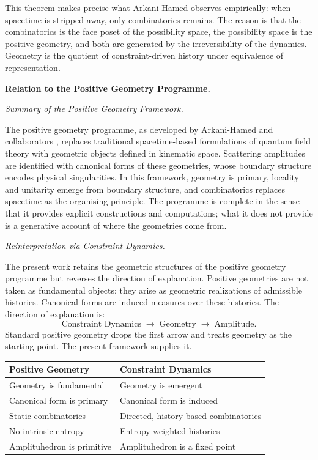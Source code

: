 \documentclass[11pt]{article}
\theoremstyle{plain}
\theoremstyle{definition}
\theoremstyle{remark}
\begin{document}
This theorem makes precise what Arkani-Hamed observes empirically: when spacetime is stripped away, only combinatorics remains. The reason is that the combinatorics is the face poset of the possibility space, the possibility space is the positive geometry, and both are generated by the irreversibility of the dynamics. Geometry is the quotient of constraint-driven history under equivalence of representation.

\bigskip\noindent\textbf{Relation to the Positive Geometry Programme.}
\label{sec:relation}

\medskip\noindent\textit{Summary of the Positive Geometry Framework.}

The positive geometry programme, as developed by Arkani-Hamed and collaborators \cite{ArkaniHamed2017, ArkaniHamed2014, ArkaniHamed2012}, replaces traditional spacetime-based formulations of quantum field theory with geometric objects defined in kinematic space. Scattering amplitudes are identified with canonical forms of these geometries, whose boundary structure encodes physical singularities. In this framework, geometry is primary, locality and unitarity emerge from boundary structure, and combinatorics replaces spacetime as the organising principle. The programme is complete in the sense that it provides explicit constructions and computations; what it does not provide is a generative account of where the geometries come from.

\medskip\noindent\textit{Reinterpretation via Constraint Dynamics.}

The present work retains the geometric structures of the positive geometry programme but reverses the direction of explanation. Positive geometries are not taken as fundamental objects; they arise as geometric realizations of admissible histories. Canonical forms are induced measures over these histories. The direction of explanation is:
\[
  \text{Constraint Dynamics} \;\longrightarrow\; \text{Geometry} \;\longrightarrow\; \text{Amplitude}.
\]
Standard positive geometry drops the first arrow and treats geometry as the starting point. The present framework supplies it.

\begin{center}
\begin{tabular}{ll}
\toprule
Positive Geometry & Constraint Dynamics \\
\midrule
Geometry is fundamental & Geometry is emergent \\
Canonical form is primary & Canonical form is induced \\
Static combinatorics & Directed, history-based combinatorics \\
No intrinsic entropy & Entropy-weighted histories \\
Amplituhedron is primitive & Amplituhedron is a fixed point \\
\bottomrule
\end{tabular}
\end{center}
\end{document}
